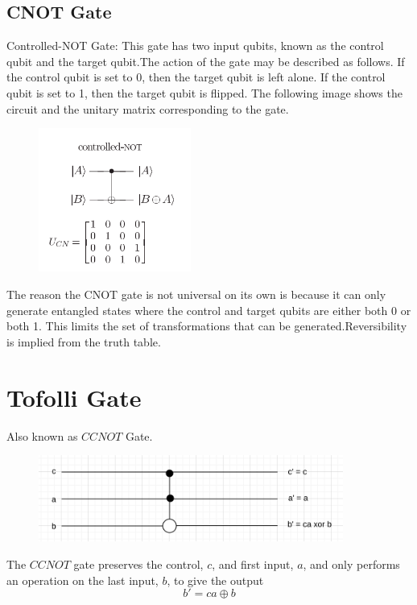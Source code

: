 \documentclass{article}
\begin{document}
\subsection{CNOT Gate}
Controlled-NOT Gate: This gate has two input qubits, known as the control qubit and the target qubit.The action of the gate may be described as follows. If the control qubit is set to 0, then the target qubit is left alone. If the control qubit is set to 1, then the target qubit is flipped. The following image shows the circuit and the unitary matrix corresponding to the gate.

\begin{figure}[htp]
	\includegraphics[width=5cm]{cnot.png}
\end{figure}

The reason the CNOT gate is not universal on its own is because it can only generate entangled states where the control and target qubits are either both 0 or both 1. This limits the set of transformations that can be generated.Reversibility is implied from the truth table.

\section{Tofolli Gate}

Also known as $CCNOT$ Gate.

\begin{figure}[htp]
	\centering
	\includegraphics[width=10cm]{tofolli.png}
\end{figure}

The $CCNOT$ gate preserves the control, $c$, and first input, $a$, and only performs an operation on the last input, $b$, to give the output $$b'=ca \oplus b$$
\end{document}
